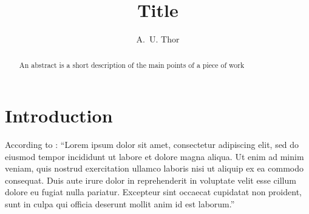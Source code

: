 \title{Title}
\author{A.~U. Thor}

\usepackage{abstract}
\usepackage{natbib}


	
\maketitle

\begin{abstract}
	An abstract is a short description of the main points of a piece of work
\end{abstract}

\section{Introduction}

According to \citet{lipsum}: ``Lorem ipsum dolor sit amet, consectetur adipiscing elit, sed do eiusmod tempor incididunt ut labore et dolore magna aliqua. Ut enim ad minim veniam, quis nostrud exercitation ullamco laboris nisi ut aliquip ex ea commodo consequat. Duis aute irure dolor in reprehenderit in voluptate velit esse cillum dolore eu fugiat nulla pariatur. Excepteur sint occaecat cupidatat non proident, sunt in culpa qui officia deserunt mollit anim id est laborum.''





